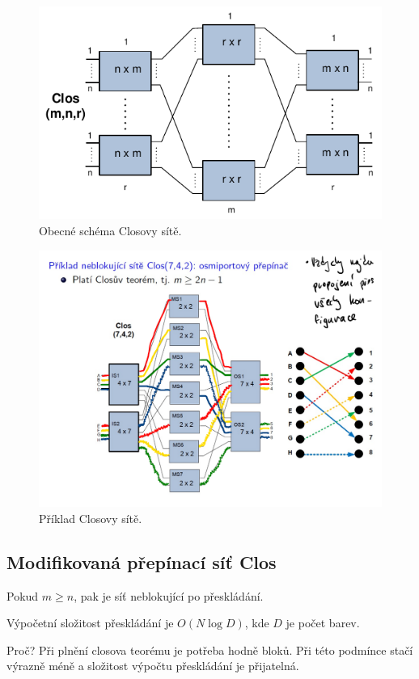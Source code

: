\begin{figure}[H]
    \centering
    \includegraphics[width=0.75\linewidth]{clos.pdf}
    \caption{Obecné schéma Closovy sítě.}
\end{figure}

\begin{figure}[H]
    \centering
    \includegraphics[width=1\linewidth]{clos_priklad.pdf}
    \caption{Příklad Closovy sítě.}
\end{figure}

\subsection{Modifikovaná přepínací síť Clos}

\begin{compactitem}
    \item Pokud $m \geq n$, pak je síť neblokující po přeskládání.
    \item Výpočetní složitost přeskládání je $O(N \log{D})$, kde $D$ je počet barev.
    \item Proč? Při plnění closova teorému je potřeba hodně bloků. Při této podmínce stačí výrazně méně a složitost výpočtu přeskládání je přijatelná.
\end{compactitem}

